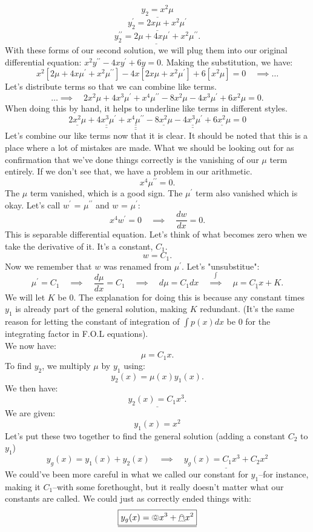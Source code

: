 \documentclass[a4paper,12pt]{article} %
\begin{document}
 $$ \underline{y_2 = x^2\mu} $$
 $$ \underline{y^{\prime}_2 = 2x\mu + x^2\mu^{\prime} }  $$
 $$ \underline{y^{\prime \prime}_2 = 2\mu + 4x\mu^{\prime} + x^2\mu^{\prime \prime}}. $$
 With these forms of our second solution, we will plug them into our original differential equation: $x^2 y^{\prime \prime}-4 x y^{\prime}+6 y=0$.
 Making the substitution, we have:
 $$ x^2[2\mu + 4x\mu^{\prime} + x^2\mu^{\prime \prime}] -4x[2x\mu + x^2\mu^{\prime}] + 6[x^2\mu] = 0 \quad\implies \ldots$$
 Let's distribute terms so that we can combine like terms.
 $$\ldots\implies \quad 2x^2\mu + 4x^3\mu^{\prime} + x^4\mu^{\prime \prime} - 8x^2\mu - 4x^3\mu^{\prime} + 6x^2\mu = 0. $$
 When doing this by hand, it helps to underline like terms in different styles.
 $$ \underline{2x^2\mu} + \underline{\underline{4x^3\mu^{\prime}}} + \underline{\underline{\underline{x^4\mu^{\prime \prime}}}} - \underline{8x^2\mu} - \underline{\underline{4x^3\mu^{\prime}}} + \underline{6x^2\mu} = 0 $$
 Let's combine our like terms now that it is clear. It should be noted that this is a place where a lot of mistakes are made. What we should be looking out for as confirmation that we've done things correctly is the vanishing of our $\mu$ term entirely. If we don't see that, we have a problem in our arithmetic.
 $$ x^4\mu^{\prime \prime} = 0 .$$
 The $\mu$ term vanished, which is a good sign. The $\mu^{\prime}$ term also vanished which is okay. Let's call $w^{\prime}$ = $\mu^{\prime \prime}$ and $w$ = $\mu^{\prime}$:
 $$ x^4w^{\prime} = 0 \quad\implies \quad \frac{dw	}{dx} = 0.$$
 This is separable differential equation. Let's think of what becomes zero when we take the derivative of it. It's a constant, $C_1$.
 $$  w = C_1.$$
 Now we remember that $w$ was renamed from $\mu^{\prime}$. Let's "unsubstitue":
 $$ \mu^\prime = C_1 \quad\implies \quad \frac{d\mu}{dx} = C_1 \quad\implies \quad d\mu = C_1dx \quad\overset{\int}\implies \quad \underline{\mu = C_1x + K}. $$
 We will let $K$ be 0. The explanation for doing this is because any constant times $y_1$ is already part of the general solution, making $K$ redundant. (It's the same reason for letting the constant of integration of $\int p(x)dx$ be 0 for the integrating factor in F.O.L equations).\\
 
 We now have:
 $$ \mu = C_1x. $$
 To find $y_2$, we multiply $\mu$ by $y_1$ using:
 $$ y_2(x) = \mu(x)y_1(x). $$
 We then have:
 $$ \underline{y_2(x) = C_1x^3.} $$
 We are given:
 $$ y_1(x) = x^2 $$
 Let's put these two together to find the general solution (adding a constant $C_2$ to $y_1$)
 $$ y_g(x) = y_1(x) + y_2(x) \quad\implies \quad \underline{\boxed{y_g(x) = C_1x^3 + C_2x^2}} $$
 We could've been more careful in what we called our constant for $y_1$--for instance, making it $C_1$--with some forethought, but it really doesn't matter what our constants are called. We could just as correctly ended things with:
 $$ \underline{\boxed{y_g(x) = \pumpkin x^3 + \mathghost x^2}} $$
\end{document}
